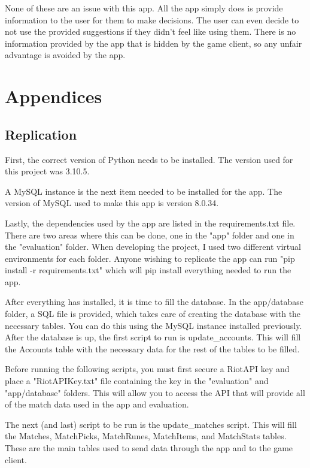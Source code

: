\documentclass[10pt,twocolumn]{article}
\begin{document}
None of these are an issue with this app.
All the app simply does is provide information to the user for them to make decisions.
The user can even decide to not use the provided suggestions if they didn't feel like using them.
There is no information provided by the app that is hidden by the game client, so any unfair advantage is avoided by the app.

\section{Appendices}

\subsection{Replication}
First, the correct version of Python needs to be installed.
The version used for this project was 3.10.5.

A MySQL instance is the next item needed to be installed for the app.
The version of MySQL used to make this app is version 8.0.34.

Lastly, the dependencies used by the app are listed in the requirements.txt file.
There are two areas where this can be done, one in the "app" folder and one in the "evaluation" folder.
When developing the project, I used two different virtual environments for each folder.
Anyone wishing to replicate the app can run "pip install -r requirements.txt" which will pip install everything needed to run the app.

After everything has installed, it is time to fill the database.
In the app/database folder, a SQL file is provided, which takes care of creating the database with the necessary tables.
You can do this using the MySQL instance installed previously.
After the database is up, the first script to run is update\_accounts.
This will fill the Accounts table with the necessary data for the rest of the tables to be filled.

Before running the following scripts, you must first secure a RiotAPI key and place a "RiotAPIKey.txt" file containing the key in the "evaluation" and "app/database" folders.
This will allow you to access the API that will provide all of the match data used in the app and evaluation.

The next (and last) script to be run is the update\_matches script.
This will fill the Matches, MatchPicks, MatchRunes, MatchItems, and MatchStats tables.
These are the main tables used to send data through the app and to the game client.
\end{document}
